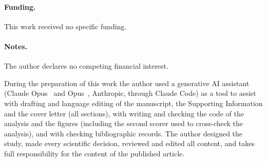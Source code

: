 \documentclass[journal=jcisd8,manuscript=article]{achemso}
\begin{document}
\paragraph*{Funding.} This work received no specific funding.

\paragraph*{Notes.} The author declares no competing financial interest.

\begin{acknowledgement}
During the preparation of this work the author used a generative AI assistant (Claude Opus~ and Opus~,
Anthropic, through Claude Code) as a tool to assist with drafting and language editing of the manuscript, the
Supporting Information and the cover letter (all sections), with writing and checking the code of the analysis and
the figures (including the second scorer used to cross-check the analysis), and with checking bibliographic records.
The author designed the study, made every scientific decision, reviewed and edited all content, and takes full
responsibility for the content of the published article.
\end{acknowledgement}

{\raggedright

}
\end{document}
